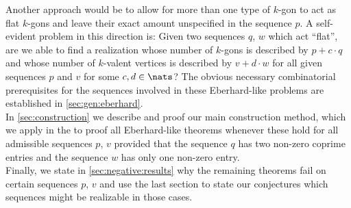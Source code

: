 Another approach would be to allow for more than one type of $k$-gon to act as flat $k$-gons and leave their exact amount unspecified in the sequence $p$. A self-evident problem in this direction is: Given two sequences $q$, $w$ which act ``flat'', are we able to find a realization whose number of $k$-gons is described by $p + c\cdot q$ and whose number of $k$-valent vertices is described by $v + d\cdot w$ for all given sequences $p$ and $v$ for some $c, d \in \nats$? The obvious necessary combinatorial prerequisites for the sequences involved in these {\sc Eberhard}-like problems are established in \autoref{sec:gen:eberhard}.\\

In \autoref{sec:construction} we describe and proof our main construction method, which we apply in the  to proof all {\sc Eberhard}-like theorems whenever these hold for all admissible sequences $p$, $v$ provided that the sequence $q$ has two non-zero coprime entries and the sequence $w$ has only one non-zero entry.\\

Finally, we state in \autoref{sec:negative:results} why the remaining theorems fail on certain sequences $p$, $v$ and use the last section to state our conjectures which sequences might be realizable in those cases.